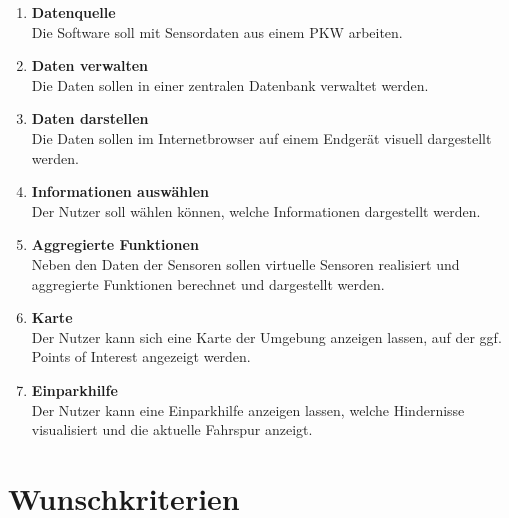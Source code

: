 \documentclass[pflichtenheft.tex]{subfiles}
\begin{document}
\begin{enumerate}

	\item{\textbf{Datenquelle}} \\Die Software soll mit Sensordaten aus einem PKW arbeiten.

	\item{\textbf{Daten verwalten}} \\Die Daten sollen in einer zentralen Datenbank verwaltet werden.

	\item{\textbf{Daten darstellen}} \\Die Daten sollen im Internetbrowser auf einem Endgerät visuell dargestellt werden.

	\item{\textbf{Informationen auswählen}} \\Der Nutzer soll wählen können, welche Informationen dargestellt werden.

	\item{\textbf{Aggregierte Funktionen}} \\Neben den Daten der Sensoren sollen virtuelle Sensoren realisiert und aggregierte Funktionen berechnet und dargestellt werden.

	\item{\textbf{Karte}} \\Der Nutzer kann sich eine Karte der Umgebung anzeigen lassen, auf der ggf. Points of Interest angezeigt werden.

	\item{\textbf{Einparkhilfe}} \\Der Nutzer kann eine Einparkhilfe anzeigen lassen, welche Hindernisse visualisiert und die aktuelle Fahrspur anzeigt.




\end{enumerate}

\renewcommand{\theenumi}{/WK\ifnum \value{enumi}<10 0\fi\arabic{enumi}0/}
\renewcommand{\labelenumi}{\theenumi}
\renewcommand{\theenumii}{\arabic{enumii}}
\renewcommand{\labelenumii}{/WK\ifnum \value{enumi}<10 0\fi\arabic{enumi}\arabic{enumii}/}
\section{Wunschkriterien}
\end{document}
